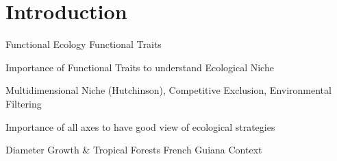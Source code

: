 \label{sec:Intro}
\section*{Introduction}

Functional Ecology \rightarrow Functional Traits

Importance of Functional Traits to understand Ecological Niche

Multidimensional Niche (Hutchinson), Competitive Exclusion, Environmental Filtering

Importance of all axes to have good view of ecological strategies

Diameter Growth \& Tropical Forests \rightarrow French Guiana Context